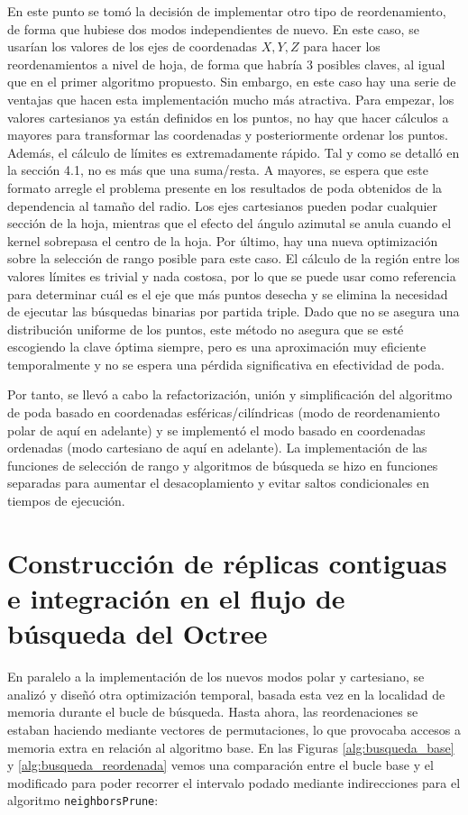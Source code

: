 En este punto se tomó la decisión de implementar otro tipo de reordenamiento, de forma que hubiese dos modos independientes de nuevo. En este caso, se usarían los valores de los ejes de coordenadas $X,Y,Z$ para hacer los reordenamientos a nivel de hoja, de forma que habría 3 posibles claves, al igual que en el primer algoritmo propuesto. Sin embargo, en este caso hay una serie de ventajas que hacen esta implementación mucho más atractiva. Para empezar, los valores cartesianos ya están definidos en los puntos, no hay que hacer cálculos a mayores para transformar las coordenadas y posteriormente ordenar los puntos. Además, el cálculo de límites es extremadamente rápido. Tal y como se detalló en la sección 4.1, no es más que una suma/resta. A mayores, se espera que este formato arregle el problema presente en los resultados de poda obtenidos de la dependencia al tamaño del radio. Los ejes cartesianos pueden podar cualquier sección de la hoja, mientras que el efecto del ángulo azimutal se anula cuando el kernel sobrepasa el centro de la hoja. Por último, hay una nueva optimización sobre la selección de rango posible para este caso. El cálculo de la región entre los valores límites es trivial y nada costosa, por lo que se puede usar como referencia para determinar cuál es el eje que más puntos desecha y se elimina la necesidad de ejecutar las búsquedas binarias por partida triple. Dado que no se asegura una distribución uniforme de los puntos, este método no asegura que se esté escogiendo la clave óptima siempre, pero es una aproximación muy eficiente temporalmente y no se espera una pérdida significativa en efectividad de poda.

Por tanto, se llevó a cabo la refactorización, unión y simplificación del algoritmo de poda basado en coordenadas esféricas/cilíndricas (modo de reordenamiento polar de aquí en adelante) y se implementó el modo basado en coordenadas ordenadas (modo cartesiano de aquí en adelante). La implementación de las funciones de selección de rango y algoritmos de búsqueda se hizo en funciones separadas para aumentar el desacoplamiento y evitar saltos condicionales en tiempos de ejecución.

\section{Construcción de réplicas contiguas e integración en el flujo de búsqueda del Octree}
En paralelo a la implementación de los nuevos modos polar y cartesiano, se analizó y diseñó otra optimización temporal, basada esta vez en la localidad de memoria durante el bucle de búsqueda. Hasta ahora, las reordenaciones se estaban haciendo mediante vectores de permutaciones, lo que provocaba accesos a memoria extra en relación al algoritmo base. En las Figuras \ref{alg:busqueda_base} y \ref{alg:busqueda_reordenada} vemos una comparación entre el bucle base y el modificado para poder recorrer el intervalo podado mediante indirecciones para el algoritmo \texttt{neighborsPrune}:

